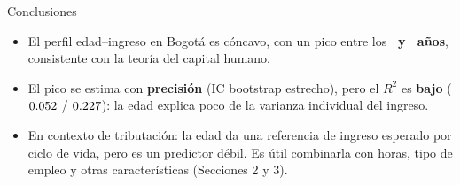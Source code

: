 \documentclass[aspectratio=169]{beamer}
\begin{document}
\begin{frame}{Conclusiones}
  \begin{itemize}
    \item El perfil edad--ingreso en Bogotá es cóncavo, con un pico entre los
      \textbf{\AgePeakUncond\ y \AgePeakCond\ años}, consistente con la teoría del
      capital humano.
    \item El pico se estima con \textbf{precisión} (IC bootstrap estrecho), pero el
      $R^2$ es \textbf{bajo} ($0.052$ / $0.227$): la edad explica poco
      de la varianza individual del ingreso.
    \item En contexto de tributación: la edad da una referencia de ingreso esperado
      por ciclo de vida, pero es un predictor débil. Es útil combinarla con
      horas, tipo de empleo y otras características (Secciones 2 y 3).
  \end{itemize}
\end{frame}
\end{document}
